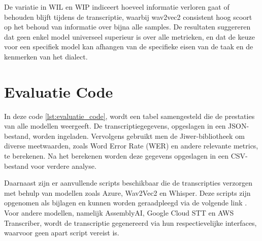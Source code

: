 De variatie in WIL en WIP indiceert hoeveel informatie verloren gaat of behouden blijft tijdens de transcriptie, waarbij wav2vec2 consistent hoog scoort op het behoud van informatie over bijna alle samples. De resultaten suggereren dat geen enkel model universeel superieur is over alle metrieken, en dat de keuze voor een specifiek model kan afhangen van de specifieke eisen van de taak en de kenmerken van het dialect.

\section{Evaluatie Code}

In deze code \ref{lst:evaluatie_code}, wordt een tabel samengesteld die de prestaties van alle modellen weergeeft. De transcriptiegegevens, opgeslagen in een JSON-bestand, worden ingeladen. Vervolgens gebruikt men de Jiwer-bibliotheek om diverse meetwaarden, zoals Word Error Rate (WER) en andere relevante metrics, te berekenen. Na het berekenen worden deze gegevens opgeslagen in een CSV-bestand voor verdere analyse.

Daarnaast zijn er aanvullende scripts beschikbaar die de transcripties verzorgen met behulp van modellen zoals Azure, Wav2Vec2 en Whisper. Deze scripts zijn opgenomen als bijlagen en kunnen worden geraadpleegd via de volgende link \autocite{AitCheikhAhmed2024}. Voor andere modellen, namelijk AssemblyAI, Google Cloud STT en AWS Transcriber, wordt de transcriptie gegenereerd via hun respectievelijke interfaces, waarvoor geen apart script vereist is.

